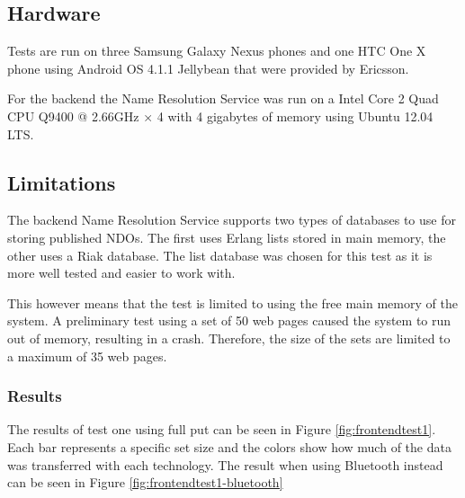 \subsection{Hardware}

Tests are run on three Samsung Galaxy Nexus phones and one HTC One X phone using Android OS 4.1.1 Jellybean that were provided by Ericsson.

For the backend the Name Resolution Service was run on a Intel Core 2 Quad CPU Q9400 @ 2.66GHz × 4 with 4 gigabytes of memory using Ubuntu 12.04 LTS.

\subsection{Limitations}

The backend Name Resolution Service supports two types of databases to use for storing published NDOs. The first uses Erlang lists stored in main memory, the other uses a Riak database. The list database was chosen for this test as it is more well tested and easier to work with.

This however means that the test is limited to using the free main memory of the system. A preliminary test using a set of 50 web pages caused the system to run out of memory, resulting in a crash. Therefore, the size of the sets are limited to a maximum of 35 web pages.

\subsubsection{Results}




The results of test one using full put can be seen in Figure \ref{fig:frontendtest1}. Each bar represents a specific set size and the colors show how much of the data was transferred with each technology. The result when using Bluetooth instead can be seen in Figure \ref{fig:frontendtest1-bluetooth}

